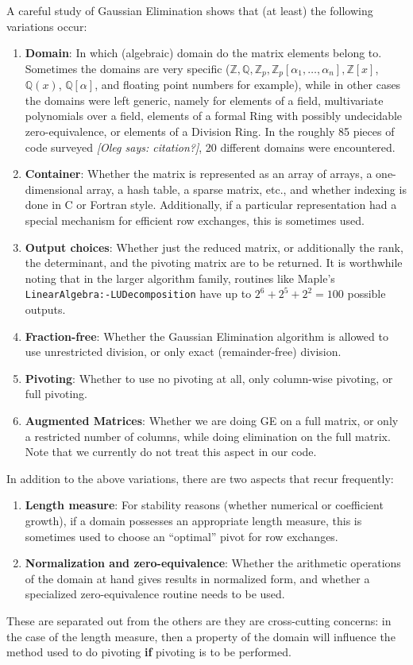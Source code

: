 \documentclass{llncs}
\newcommand{\oleg}[1]{{\it [Oleg says: #1]}}
\begin{document}
A careful study of Gaussian Elimination \cite{carette04} shows that
(at least) the following variations occur:
\begin{enumerate}
	\item \textbf{Domain}: In which (algebraic) domain do the matrix
		elements belong to.  Sometimes the domains are very specific
		($\mathbb{Z}, \mathbb{Q}, \mathbb{Z}_p, 
		\mathbb{Z}_p\left[\alpha_1,\ldots,\alpha_n\right], 
		\mathbb{Z}\left[x\right]$, $\mathbb{Q}\left(x\right)$, 
		$\mathbb{Q}\left[\alpha\right]$, and floating point numbers for 
		example), while in other cases the domains were left generic,
		namely for elements of a field,
		multivariate polynomials over a field, elements of a formal Ring
		with possibly undecidable zero-equivalence, or elements of a 
		Division Ring.  In the roughly 85 pieces of code
		surveyed \oleg{citation?},
		20 different domains were encountered.
	\item \textbf{Container}: Whether the matrix
		is represented as an array of arrays, a one-dimensional array,
		a hash table, a sparse matrix, etc., and
		whether indexing is done in C or Fortran style.  Additionally,
		if a particular representation had a special mechanism for efficient
		row exchanges, this is sometimes used.  
	\item \textbf{Output choices}:  Whether just the reduced matrix, or
		additionally the rank, the determinant, and the
		pivoting matrix are to be returned.
		It is worthwhile noting that in the larger algorithm family,
		routines like Maple's \texttt{LinearAlgebra:-LUDecomposition} have
		up to $2^6 + 2^5 + 2^2 = 100$ possible outputs.
	\item \textbf{Fraction-free}: Whether the Gaussian Elimination
		algorithm is allowed to use unrestricted division, or only
		exact (remainder-free) division.
	\item \textbf{Pivoting}: Whether to use no pivoting at all, only
		column-wise pivoting, or full pivoting.
	\item \textbf{Augmented Matrices}: Whether we are doing GE on
		a full matrix, or only a restricted number of columns, while
		doing elimination on the full matrix.  Note that we currently
		do not treat this aspect in our code.
\end{enumerate}
\noindent In addition to the above variations, there are two aspects that 
recur frequently:
\begin{enumerate}
	\item \textbf{Length measure}:  For stability reasons
		(whether numerical or coefficient growth), if a domain possesses
		an appropriate length measure, this is sometimes used to choose
		an ``optimal'' pivot for row exchanges.
	\item \textbf{Normalization and zero-equivalence}: Whether the 
		arithmetic operations of the domain at hand gives results in 
		normalized form, and whether a specialized zero-equivalence 
		routine needs to be used.
\end{enumerate}
\noindent These are separated out from the others are they are cross-cutting
concerns: in the case of the length measure, then a property of the domain
will influence the method used to do pivoting \textbf{if} pivoting is to be
performed.
\end{document}
